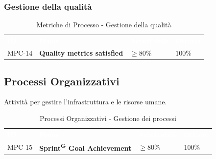 \documentclass[a4paper, 11pt]{article}
\begin{document}
\subsubsection{Gestione della qualità}
\begin{table}[h!]
    \centering
    \begin{tabular}{>{\centering\arraybackslash}m{1.5cm} p{6cm} >{\centering\arraybackslash}m{3cm} >{\centering\arraybackslash}m{2.5cm}}
        \rowcolor{AccentColor}
        \textcolor{white}{\textbf{ID}} & \textcolor{white}{\textbf{Nome}} & \textcolor{white}{\textbf{Accettabile}} & \textcolor{white}{\textbf{Ottimo}} \\
        
        MPC-14 & \textbf{Quality metrics satisfied} & $\geq 80\%$ & $100\%$ \\
    \end{tabular}
    \caption{Metriche di Processo - Gestione della qualità}
\end{table}

\subsection{Processi Organizzativi}
Attività per gestire l'infrastruttura e le risorse umane.
\begin{table}[h!]
    \centering
    \begin{tabular}{>{\centering\arraybackslash}m{1.5cm} p{6cm} >{\centering\arraybackslash}m{3cm} >{\centering\arraybackslash}m{2.5cm}}
        \rowcolor{AccentColor}
        \textcolor{white}{\textbf{ID}} & \textcolor{white}{\textbf{Nome}} & \textcolor{white}{\textbf{Accettabile}} & \textcolor{white}{\textbf{Ottimo}} \\
        
        MPC-15 & \textbf{Sprint\textsuperscript{G} Goal Achievement} & $\geq 80\%$ & $100\%$ \\
    \end{tabular}
    \caption{Processi Organizzativi - Gestione dei processi}
\end{table}

\newpage 

\end{document}
